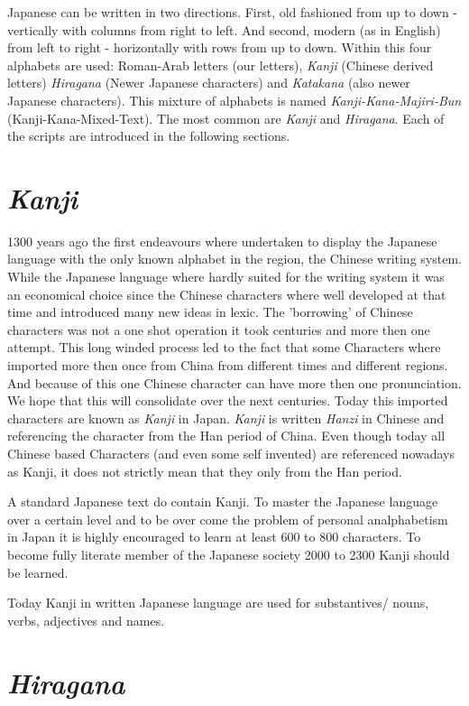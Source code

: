 Japanese can be written in two directions. First, old fashioned from up to down
- vertically with columns from right to left. And second, modern (as in
English) from left to right - horizontally with rows from up to down. Within
this four alphabets are used: Roman-Arab letters (our letters), \textit{Kanji}
(Chinese derived letters)  \textit{Hiragana} (Newer Japanese characters) and
\textit{Katakana} (also newer Japanese characters).  This mixture of alphabets
is named \textit{Kanji-Kana-Majiri-Bun} (Kanji-Kana-Mixed-Text). The most
common are \textit{Kanji} and \textit{Hiragana}. Each of the scripts are
introduced in the following sections.

\section*{\textit{Kanji}} 

1300 years ago the first endeavours where undertaken to display the Japanese
language with the only known alphabet in the region, the Chinese writing
system. While the Japanese language where hardly suited for the writing system
it was an  economical choice since the Chinese characters where well developed
at that time and introduced many new ideas in lexic. The 'borrowing' of Chinese
characters was not a one shot operation it took centuries and more then one
attempt. This long winded process led to the fact that some Characters where
imported more then once from China from different times and different regions.
And because of this one Chinese character can have more then one pronunciation.
We hope that this will consolidate over the next centuries.  Today this
imported characters are known as \textit{Kanji} in Japan.  \textit{Kanji} is
written \textit{Hanzi} in Chinese and referencing the character from the Han
period of China. Even though today all Chinese based Characters (and even some
self invented) are referenced nowadays as Kanji, it does not strictly mean that
they only from the Han period.

A standard Japanese text do contain Kanji. To master the Japanese language over
a certain level and to be over come the problem of personal analphabetism in
Japan it is highly encouraged to learn at least 600 to 800 characters. To
become fully literate member of the Japanese society 2000 to 2300 Kanji should
be learned. 

Today  Kanji in written Japanese language are used for substantives/ nouns,
verbs, adjectives and names. 

\section*{\textit{Hiragana}}

